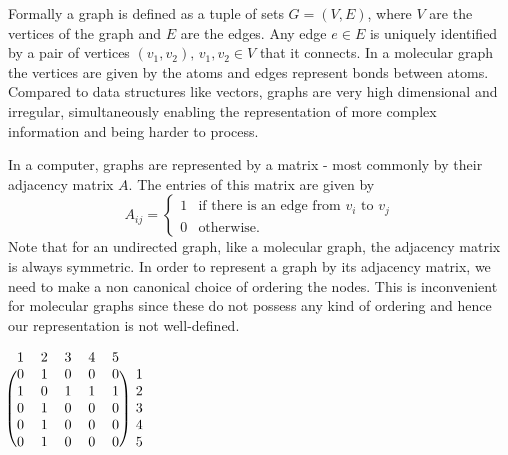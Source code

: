 Formally a graph is defined as a tuple of sets $G = (V,E)$, where $V$ are the vertices of the graph and $E$ are the edges. Any edge $e \in E$ is uniquely identified by a pair of vertices $(v_1, v_2), \, v_1, v_2 \in V$ that it connects. In a molecular graph the vertices are given by the atoms and edges represent bonds between atoms. Compared to data structures like vectors, graphs are very high dimensional and irregular, simultaneously enabling the representation of more complex information and being harder to process.

In a computer, graphs are represented by a matrix - most commonly by their adjacency matrix $A$. The entries of this matrix are given by 
\begin{equation}
	A_{ij} = 
	\begin{cases}
		1 & \text{if there is an edge from } v_i \text{ to } v_j \\
		0 & \text{otherwise.}
	\end{cases}
\end{equation}
Note that for an undirected graph, like a molecular graph, the adjacency matrix is always symmetric. In order to represent a graph by its adjacency matrix, we need to make a non canonical choice of ordering the nodes. This is inconvenient for molecular graphs since these do not possess any kind of ordering and hence our representation is not well-defined. 

\begin{minipage}{0.5\textwidth}
	\centering
	
\end{minipage}
\begin{minipage}{0.5\textwidth}
	\centering
	$
	\begin{blockarray}{cccccc}
	1 & 2 & 3 & 4 & 5 \\
	\begin{block}{(ccccc)c}
	0 & 1 & 0 & 0 & 0 & 1 \\
	1 & 0 & 1 & 1 & 1 & 2 \\
	0 & 1 & 0 & 0 & 0 & 3 \\
	0 & 1 & 0 & 0 & 0 & 4 \\
	0 & 1 & 0 & 0 & 0 & 5 \\
	\end{block}
	\end{blockarray}
	$
\end{minipage}
